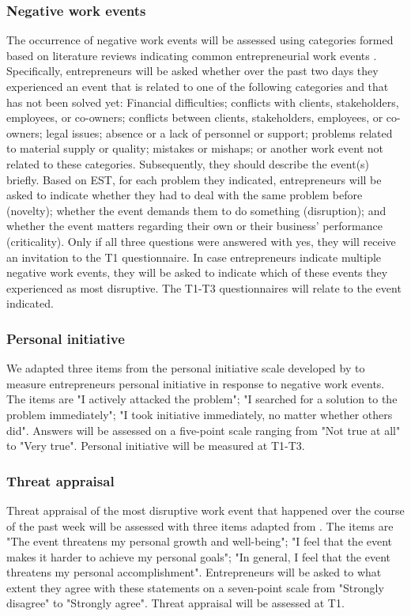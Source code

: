 \documentclass[man, 12pt, a4paper, noextraspace]{apa6}
\begin{document}
\subsubsection{Negative work events}
The occurrence of negative work events will be assessed using categories formed based on literature reviews indicating common entrepreneurial work events \parencite{Lechat2017, Pontikes2017, Cope.2003}. 
Specifically, entrepreneurs will be asked whether over the past two days they experienced an event that is related to one of the following categories and that has not been solved yet: Financial difficulties; conflicts with clients, stakeholders, employees, or co-owners; conflicts between clients, stakeholders, employees, or co-owners; legal issues; absence or a lack of personnel or support; problems related to material supply or quality; mistakes or mishaps; or another work event not related to these categories. 
Subsequently, they should describe the event(s) briefly.
Based on EST, for each problem they indicated, entrepreneurs will be asked to indicate whether they had to deal with the same problem before (novelty); whether the event demands them to do something (disruption); and whether the event matters regarding their own or their business' performance (criticality).
Only if all three questions were answered with yes, they will receive an invitation to the T1 questionnaire. 
In case entrepreneurs indicate multiple negative work events, they will be asked to indicate which of these events they experienced as most disruptive. 
The T1-T3 questionnaires will relate to the event indicated. 

\subsubsection{Personal initiative}
We adapted three items from the personal initiative scale developed by \textcite{Frese1997} to measure entrepreneurs personal initiative in response to negative work events. 
The items are "I actively attacked the problem"; "I searched for a solution to the problem immediately"; "I took initiative immediately, no matter whether others did". 
Answers will be assessed on a five-point scale ranging from "Not true at all" to "Very true".
Personal initiative will be measured at T1-T3. 

\subsubsection{Threat appraisal}
Threat appraisal of the most disruptive work event that happened over the course of the past week will be assessed with three items adapted from \textcite{LePine.2016}. 
The items are "The event threatens my personal growth and well-being"; "I feel that the event makes it harder to achieve my personal goals"; "In general, I feel that the event threatens my personal accomplishment". 
Entrepreneurs will be asked to what extent they agree with these statements on a seven-point scale from "Strongly disagree" to "Strongly agree". 
Threat appraisal will be assessed at T1. 
\end{document}
